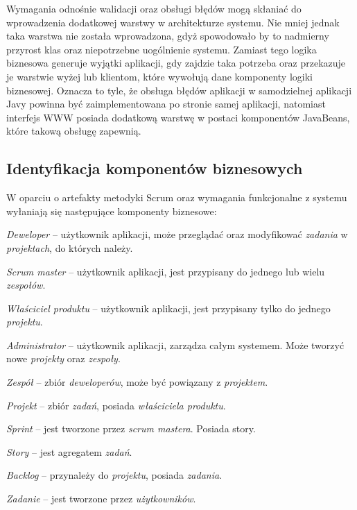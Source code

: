 Wymagania odnośnie walidacji oraz obsługi błędów mogą skłaniać do wprowadzenia dodatkowej warstwy w architekturze systemu. Nie mniej jednak taka warstwa nie została wprowadzona, gdyż spowodowało by to nadmierny przyrost klas oraz niepotrzebne uogólnienie systemu. Zamiast tego logika biznesowa generuje wyjątki aplikacji, gdy zajdzie taka potrzeba oraz przekazuje je warstwie wyżej lub klientom, które wywołują dane komponenty logiki biznesowej. Oznacza to tyle, że obsługa błędów aplikacji w samodzielnej aplikacji Javy powinna być zaimplementowana po stronie samej aplikacji, natomiast interfejs WWW posiada dodatkową warstwę w postaci komponentów JavaBeans, które takową obsługę zapewnią. 

\subsection{Identyfikacja komponentów biznesowych}
W oparciu o artefakty metodyki Scrum oraz wymagania funkcjonalne z systemu wyłaniają się następujące komponenty biznesowe:

\textit{Deweloper} -- użytkownik aplikacji, może przeglądać oraz modyfikować \textit{zadania} w \textit{projektach}, do których należy.

\textit{Scrum master} -- użytkownik aplikacji, jest przypisany do jednego lub wielu \textit{zespołów}.

\textit{Właściciel produktu} -- użytkownik aplikacji, jest przypisany tylko do jednego \textit{projektu}.

\textit{Administrator} -- użytkownik aplikacji, zarządza całym systemem. Może tworzyć nowe \textit{projekty} oraz \textit{zespoły}.

\textit{Zespół} -- zbiór \textit{deweloperów}, może być powiązany z \textit{projektem}.

\textit{Projekt} -- zbiór \textit{zadań}, posiada \textit{właściciela produktu}.

\textit{Sprint} -- jest tworzone przez  \textit{scrum mastera}. Posiada story.

\textit{Story} -- jest agregatem \textit{zadań}.

\textit{Backlog} -- przynależy do \textit{projektu}, posiada \textit{zadania}.

\textit{Zadanie} -- jest tworzone przez \textit{użytkowników}.


